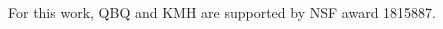 \documentclass[twocolumn,linenumbers]{aastex631}
\begin{document}
\begin{CJK*}{UTF8}{gbsn}
\begin{acknowledgments}
For this work, QBQ and KMH are supported by NSF award 1815887.
\end{acknowledgments}

%








\end{CJK*}
\end{document}
